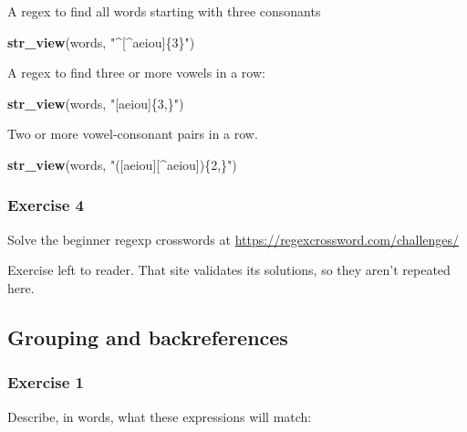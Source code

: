 \documentclass[]{book}
\newenvironment{Shaded}{\begin{snugshade}}{\end{snugshade}}
\newcommand{\KeywordTok}[1]{\textcolor[rgb]{0.13,0.29,0.53}{\textbf{#1}}}
\newcommand{\NormalTok}[1]{#1}
\newcommand{\StringTok}[1]{\textcolor[rgb]{0.31,0.60,0.02}{#1}}
\theoremstyle{plain}
\theoremstyle{remark}
\theoremstyle{definition}
\theoremstyle{definition}
\theoremstyle{definition}
\theoremstyle{remark}
\begin{document}
A regex to find all words starting with three consonants

\begin{Shaded}
\begin{Highlighting}[]
\KeywordTok{str_view}\NormalTok{(words, }\StringTok{"^[^aeiou]\{3\}"}\NormalTok{)}
\end{Highlighting}
\end{Shaded}

A regex to find three or more vowels in a row:

\begin{Shaded}
\begin{Highlighting}[]
\KeywordTok{str_view}\NormalTok{(words, }\StringTok{"[aeiou]\{3,\}"}\NormalTok{)}
\end{Highlighting}
\end{Shaded}

Two or more vowel-consonant pairs in a row.

\begin{Shaded}
\begin{Highlighting}[]
\KeywordTok{str_view}\NormalTok{(words, }\StringTok{"([aeiou][^aeiou])\{2,\}"}\NormalTok{)}
\end{Highlighting}
\end{Shaded}

\hypertarget{exercise-4-22}{%
\subsubsection{Exercise 4}\label{exercise-4-22}}

Solve the beginner regexp crosswords at
\url{https://regexcrossword.com/challenges/}

Exercise left to reader. That site validates its solutions, so they
aren't repeated here.

\hypertarget{grouping-and-backreferences}{%
\subsection{Grouping and
backreferences}\label{grouping-and-backreferences}}

\hypertarget{exercise-1-35}{%
\subsubsection{Exercise 1}\label{exercise-1-35}}

Describe, in words, what these expressions will match:
\end{document}
